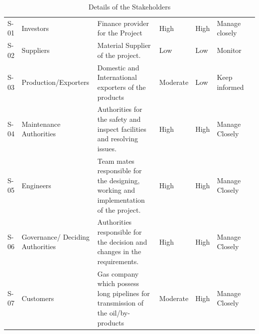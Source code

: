 \documentclass[a4paper,table]{article}
\begin{document}
\begin{table}[htb]
\caption{Details of the Stakeholders}
\label{2.1}
    \footnotesize
    \setlength\tabcolsep{3pt}
\begin{tabularx}{\linewidth}{@{} l
              >{\hsize}L
              >{\hsize}L
                            *{2}{L}*{2}{L}
                @{}}
    \toprule
{}
    &   
        &   
            &   
                &                
                    & \\
    \midrule
S-01  & Investors
        & Finance provider for the Project
            & High
                & High
                & Manage closely\\
    \addlinespace
S-02  & Suppliers
        & Material Supplier of the project. 
            & Low
                & Low
                    & Monitor\\
    \addlinespace
S-03   & Production/Exporters
        & Domestic and International \quad
        exporters of the products
            & Moderate
                & Low
                    & Keep informed\\
    \addlinespace
S-04   & Maintenance Authorities
        & Authorities for the safety and inspect facilities
        and resolving issues.
            & High
                & High
                    & Manage Closely\\
    \addlinespace
S-05   & Engineers
        & Team mates responsible for the designing, working and implementation of the project.
            & High
                & High
                    & Manage Closely\\
    \addlinespace
S-06   & Governance/ Deciding Authorities
        & Authorities responsible for the decision and changes in the requirements.
            & High
                & High
                    & Manage Closely\\
    \addlinespace
S-07   & Customers
        & Gas company which possess long pipelines for transmission of the oil/by-products
            & Moderate
                & High
                    & Manage Closely\\
    \bottomrule
\end{tabularx}
    \end{table}
\end{document}
